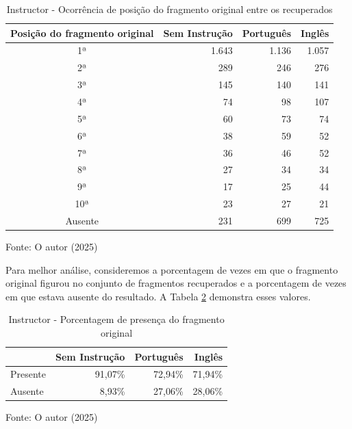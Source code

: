 \begin{table}[H]
    \caption{Instructor - Ocorrência de posição do fragmento original entre os recuperados}
    \centering
    \begin{tabular}{ c r r r }
        \hline
        \textbf{Posição do fragmento original} & \textbf{Sem Instrução} & \textbf{Português} & \textbf{Inglês} \\  
        \hline
        1ª & 1.643 & 1.136 & 1.057 \\
        2ª & 289 & 246 & 276 \\
        3ª & 145 & 140 & 141 \\
        4ª & 74 & 98 & 107 \\
        5ª & 60 & 73 & 74 \\
        6ª & 38 & 59 & 52 \\
        7ª & 36 & 46 & 52 \\
        8ª & 27 & 34 & 34 \\
        9ª & 17 & 25 & 44 \\
        10ª & 23 & 27 & 21 \\
        Ausente & 231 & 699 & 725 \\
        \hline
    \end{tabular}   
    
    Fonte: O autor (2025)
    \label{tab:recuperacao-rank-instructor}
\end{table}

Para melhor análise, consideremos a porcentagem de vezes em que o fragmento original figurou no conjunto de fragmentos recuperados e a porcentagem de vezes em que estava ausente do resultado. A Tabela \ref{tab:recuperacao-top-instructor} demonstra esses valores.

\begin{table}[H]
    \caption{Instructor - Porcentagem de presença do fragmento original}
    \centering
    \begin{tabular}{ l r r r }
        \hline
          & \textbf{Sem Instrução} & \textbf{Português} & \textbf{Inglês} \\  
        \hline
        Presente & 91,07\% & 72,94\% & 71,94\% \\
        Ausente & 8,93\% & 27,06\% & 28,06\% \\
    \hline
    \end{tabular}
    
    Fonte: O autor (2025)
    \label{tab:recuperacao-top-instructor}
\end{table}

